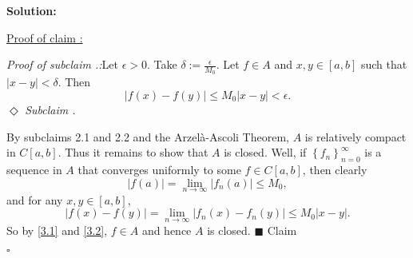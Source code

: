 \documentclass[12pt]{article}
\newcounter{ProofCounter}
\newcounter{ClaimCounter}[ProofCounter]
\newcounter{SubClaimCounter}[ClaimCounter]
\newenvironment{Solution}{\stepcounter{ProofCounter}\textbf{Solution:}}{\hfill$\square$}
\newenvironment{claimproof}[1]{\par\noindent\underline{Proof of claim \theClaimCounter:}\space#1}{\hfill $\blacksquare$ Claim \theClaimCounter}
\newenvironment{subclaim}[1]{\stepcounter{SubClaimCounter}\par\noindent\emph{Subclaim \theClaimCounter.\theSubClaimCounter:}\space#1}{}
\newenvironment{subclaimproof}[1]{\par\noindent\emph{Proof of subclaim \theClaimCounter.\theSubClaimCounter:}\space#1}{\hfill
$\Diamond$ \emph{Subclaim \theClaimCounter.\theSubClaimCounter}}
\begin{document}
\begin{Solution}
\begin{claimproof}
    \begin{subclaimproof}
      Let $\epsilon > 0$. Take $\delta := \frac{\epsilon}{M_0}$. Let $f \in A$ and $x,y \in [a,b]$ such that $|x - y| < \delta$. Then
      \[
        |f(x) - f(y)| \leq M_0|x - y| < \epsilon.
      \]
    \end{subclaimproof}

    By subclaims 2.1 and 2.2 and the Arzel{\`a}-Ascoli Theorem, $A$ is relatively compact in $C[a,b]$. Thus it remains to show that $A$ is closed.
    Well, if $\left\{ f_n \right\}_{n=0}^{\infty}$ is a sequence in $A$ that converges uniformly to some $f \in C[a,b]$, then clearly 
    \begin{equation}
      |f(a)| = \lim_{n\rightarrow\infty}|f_{n}(a)| \leq M_0,
      \label{3.1}
    \end{equation}
    and for any $x, y \in [a,b]$,
    \begin{equation}
      |f(x) - f(y)| = \lim_{n\rightarrow\infty}|f_n(x) - f_n(y)| \leq M_0 |x - y|.
      \label{3.2}
    \end{equation}
    So by \eqref{3.1} and \eqref{3.2}, $f \in A$ and hence $A$ is closed.
  \end{claimproof}

\end{Solution}

\newpage
\end{document}
